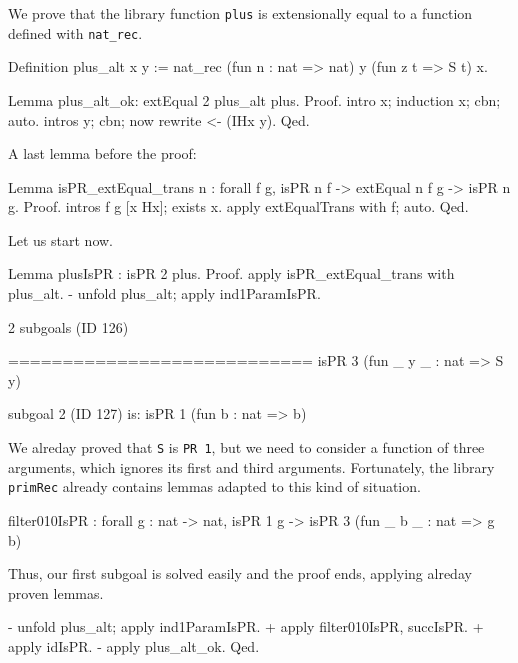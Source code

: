 We prove that the library function \texttt{plus} is extensionally equal to a function defined with
\texttt{nat\_rec}.

\begin{Coqsrc}
Definition plus_alt x y  :=
              nat_rec  (fun n : nat => nat)
                       y
                       (fun z t =>  S t)
                       x.

Lemma plus_alt_ok:
  extEqual 2 plus_alt plus.
Proof.
  intro x; induction x; cbn; auto.
  intros y; cbn; now rewrite <- (IHx y).
Qed.
\end{Coqsrc}

A last lemma before the proof:

\begin{Coqsrc}
Lemma isPR_extEqual_trans n : forall f g, isPR n f ->
                                    extEqual n f g ->
                                    isPR n g.
Proof.
 intros f g [x Hx]; exists x.
 apply extEqualTrans with f; auto.
Qed.
\end{Coqsrc}

Let us start now.

\begin{Coqsrc}
Lemma plusIsPR : isPR 2 plus.
Proof.
  apply isPR_extEqual_trans with plus_alt.
  - unfold plus_alt; apply ind1ParamIsPR.
\end{Coqsrc}

\begin{Coqanswer}
2 subgoals (ID 126)
  
  ============================
  isPR 3 (fun _ y _ : nat => S y)

subgoal 2 (ID 127) is:
 isPR 1 (fun b : nat => b)
\end{Coqanswer}

We alreday proved that \texttt{S} is \texttt{PR 1}, but we need to consider a function of three arguments, which ignores its first and third arguments.
Fortunately, the library \texttt{primRec} already contains lemmas adapted to this kind of situation.

\begin{Coqanswer}
filter010IsPR :
forall g : nat -> nat, isPR 1 g -> isPR 3 (fun _ b _ : nat => g b)
\end{Coqanswer}

Thus, our first subgoal is solved easily and the proof ends, applying alreday proven lemmas.


\begin{Coqsrc}
 - unfold plus_alt; apply ind1ParamIsPR.
    + apply filter010IsPR, succIsPR.
    + apply idIsPR.
  - apply plus_alt_ok. 
Qed.
\end{Coqsrc}


